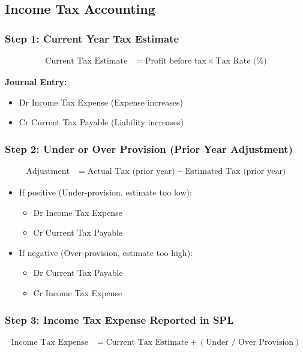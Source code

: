 \subsection{Income Tax Accounting}

\subsubsection{Step 1: Current Year Tax Estimate}
\begin{align*}
\text{Current Tax Estimate} &= \text{Profit before tax} \times \text{Tax Rate (\%)} 
\end{align*}

\noindent \textbf{Journal Entry:}
\begin{itemize}
    \item Dr Income Tax Expense \hfill (Expense increases)  
    \item Cr Current Tax Payable \hfill (Liability increases)
\end{itemize}

\subsubsection{Step 2: Under or Over Provision (Prior Year Adjustment)}
\begin{align*}
\text{Adjustment} &= \text{Actual Tax (prior year)} - \text{Estimated Tax (prior year)} 
\end{align*}

\begin{itemize}
    \item If positive (Under-provision, estimate too low):  
    \begin{itemize}
        \item Dr Income Tax Expense  
        \item Cr Current Tax Payable
    \end{itemize}
    \item If negative (Over-provision, estimate too high):  
    \begin{itemize}
        \item Dr Current Tax Payable  
        \item Cr Income Tax Expense
    \end{itemize}
\end{itemize}

\subsubsection{Step 3: Income Tax Expense Reported in SPL}
\begin{align*}
\text{Income Tax Expense} &= \text{Current Tax Estimate} + (\text{Under / Over Provision})
\end{align*}

